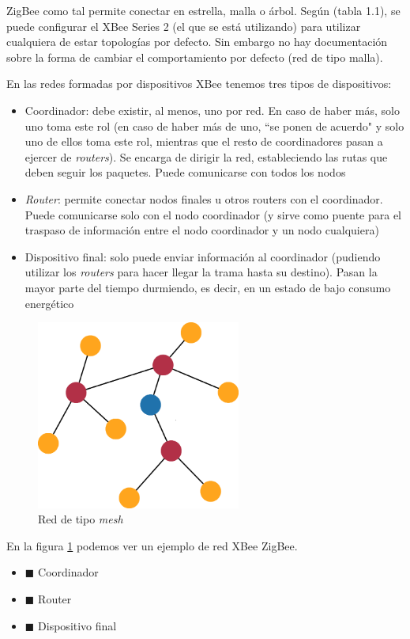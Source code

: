 ZigBee como tal permite conectar en estrella, malla o árbol. Según \cite{faludi} (tabla 1.1), se
puede configurar el XBee Series 2 (el que se está utilizando) para utilizar cualquiera de estar
topologías por defecto. Sin embargo no hay documentación sobre la forma de cambiar el comportamiento
por defecto (red de tipo malla).

En las redes formadas por dispositivos XBee tenemos tres tipos de dispositivos:
\begin{itemize}
  \item Coordinador: debe existir, al menos, uno por red. En caso de haber más, solo uno
  toma este rol (en caso de haber más de uno, ``se ponen de acuerdo" y solo uno de ellos toma
  este rol, mientras que el resto de coordinadores pasan a ejercer de \textit{routers}). Se encarga de dirigir la red,
  estableciendo las rutas que deben seguir los paquetes. Puede comunicarse con todos los nodos
  \item \textit{Router}: permite conectar nodos finales u otros routers con el coordinador. Puede
  comunicarse solo con el nodo coordinador (y sirve como puente para el traspaso de información
  entre el nodo coordinador y un nodo cualquiera)
  \item Dispositivo final: solo puede enviar información al coordinador (pudiendo utilizar
  los \textit{routers} para hacer llegar la trama hasta su destino). Pasan la mayor parte del tiempo
  durmiendo, es decir, en un estado de bajo consumo energético
\end{itemize}

\begin{figure}[!htb]
\centering
\includegraphics[width=0.6\textwidth]{./imagenes/mesh}
\caption{Red de tipo \textit{mesh}} \label{fig:mesh}
\end{figure}

En la figura \ref{fig:mesh} podemos ver un ejemplo de red XBee ZigBee.
\begin{itemize}
  \item  \textcolor{blueS}{$\blacksquare$} Coordinador
  \item  \textcolor{rojoOscuroS}{$\blacksquare$} Router
  \item  \textcolor{naranjaS}{$\blacksquare$} Dispositivo final
\end{itemize}

